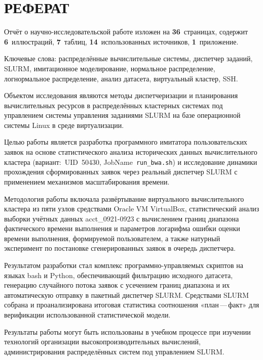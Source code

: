 %
%

\section*{РЕФЕРАТ}

Отчёт о научно-исследовательской работе изложен на \textbf{36}~страницах,
содержит \textbf{6}~иллюстраций, \textbf{7}~таблиц,
\textbf{14}~использованных источников, \textbf{1}~приложение.

Ключевые слова: распределённые вычислительные системы, диспетчер
заданий, SLURM, имитационное моделирование, нормальное распределение,
логнормальное распределение, анализ датасета, виртуальный кластер, SSH.

Объектом исследования являются методы диспетчеризации и планирования
вычислительных ресурсов в распределённых кластерных системах под
управлением системы управления заданиями SLURM на базе операционной
системы Linux в среде виртуализации.

Целью работы является разработка программного имитатора
пользовательских заявок на основе статистического анализа исторических
данных вычислительного кластера (вариант:~UID~50430,
JobName~\texttt{run\_bwa.sh}) и исследование динамики прохождения
сформированных заявок через реальный диспетчер SLURM с применением
механизмов масштабирования времени.

Методология работы включала развёртывание виртуального вычислительного
кластера из пяти узлов средствами Oracle VM VirtualBox, статистический
анализ выборки учётных данных acct\_0921-0923 с вычислением границ
диапазона фактического времени выполнения и параметров логарифма ошибки
оценки времени выполнения, формируемой пользователем, а также натурный эксперимент
по постановке сгенерированных заявок в очередь диспетчера.

Результатом разработки стал комплекс программно-управляемых скриптов
на языках bash и Python, обеспечивающий фильтрацию исходного датасета,
генерацию случайного потока заявок с усечением границ диапазона и их
автоматическую отправку в пакетный диспетчер SLURM. Средствами SLURM
собрана и проанализирована итоговая статистика соотношения
«план\,---\,факт» для верификации использованной статистической модели.

Результаты работы могут быть использованы в учебном процессе при
изучении технологий организации высокопроизводительных вычислений,
администрирования распределённых систем под управлением SLURM.

\newpage